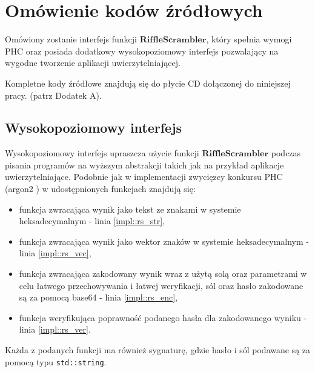\section{Omówienie kodów źródłowych}
Omówiony zostanie interfejs funkcji $\mathbf{RiffleScrambler}$, który spełnia wymogi PHC oraz posiada dodatkowy wysokopoziomowy interfejs pozwalający na wygodne tworzenie aplikacji uwierzytelniającej.

Kompletne kody źródłowe znajdują się do płycie CD dołączonej do niniejszej pracy. (patrz Dodatek A).

\subsection{Wysokopoziomowy interfejs}
Wysokopoziomowy interfejs upraszcza użycie funkcji $\mathbf{RiffleScrambler}$ podczas pisania
programów na wyższym abstrakcji takich jak na przykład aplikacje uwierzytelniające.
Podobnie jak w implementacji zwycięzcy konkursu PHC (argon2 \cite{Argon2}) w udostępnionych funkcjach znajdują się:
\begin{itemize}
	\item funkcja zwracająca wynik jako tekst ze znakami w systemie heksadecymalnym - linia \ref{impl::rs_str},
	\item funkcja zwracająca wynik jako wektor znaków w systemie heksadecymalnym - linia \ref{impl::rs_vec},
	\item funkcja zwracająca zakodowany wynik wraz z użytą solą oraz parametrami w celu łatwego przechowywania i łatwej weryfikacji, sól oraz hasło zakodowane są za pomocą base64 \cite{base64} - linia \ref{impl::rs_enc},
	\item funkcja weryfikująca poprawność podanego hasła dla zakodowanego wyniku - linia \ref{impl::rs_ver}.
\end{itemize}

Każda z podanych funkcji ma również sygnaturę, gdzie hasło i sól podawane są za pomocą typu \texttt{std::string}.

